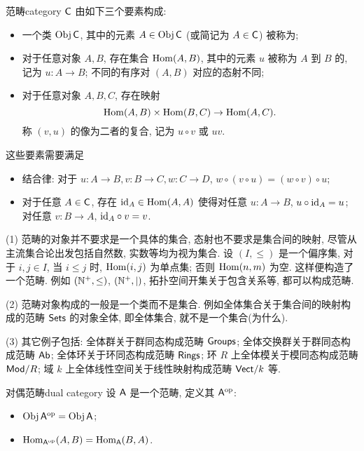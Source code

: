 \begin{definition}{范畴}{category}
 ${\mathsf{C}}$ 由如下三个要素构成:
\begin{itemize}
\item 一个类 ${\mathrm{Obj}\,}{\mathsf{C}}$, 其中的元素 $A\in{\mathrm{Obj}\,}{\mathsf{C}}$ (或简记为 $A\in{\mathsf{C}}$) 被称为;
\item 对于任意对象 $A,B$, 存在集合 ${\mathrm{Hom}}(A,B)$, 其中的元素 $u$ 被称为 $A$ 到 $B$ 的, 记为 $u:A\to B$; 不同的有序对 $(A,B)$ 对应的态射不同;
\item 对于任意对象 $A,B,C$, 存在映射
  \[{\mathrm{Hom}}(A,B)\times{\mathrm{Hom}}(B,C)\to {\mathrm{Hom}}(A,C).\]
称 $(v,u)$ 的像为二者的复合, 记为 $u\circ v$ 或 $uv$.
\end{itemize}
这些要素需要满足
\begin{itemize}
\item 结合律: 对于 $u:A\to B, v:B\to C, w:C\to D$, $w\circ(v\circ u)=(w\circ v)\circ u$;
\item 对于任意 $A\in{\mathsf{C}}$, 存在 ${\mathrm{id}}_A\in{\mathrm{Hom}}(A,A)$ 使得对任意 $u:A\to B$, $u\circ{\mathrm{id}}_A=u$; 对任意 $v:B\to A$, ${\mathrm{id}}_A\circ v=v$.
\end{itemize}
\end{definition}

\begin{example}
(1) 范畴的对象并不要求是一个具体的集合, 态射也不要求是集合间的映射, 尽管从主流集合论出发包括自然数, 实数等均为视为集合. 设 $(I,\le)$ 是一个偏序集, 对于 $i,j\in I$, 当 $i\le j$ 时, ${\mathrm{Hom}}(i,j)$ 为单点集; 否则 ${\mathrm{Hom}}(n,m)$ 为空. 这样便构造了一个范畴. 例如 $({\mathbb{N}}^+,\le)$, $({\mathbb{N}}^+,\mid)$, 拓扑空间开集关于包含关系等, 都可以构成范畴.

(2) 范畴对象构成的一般是一个类而不是集合. 例如全体集合关于集合间的映射构成的范畴 ${\mathsf{Sets}}$ 的对象全体, 即全体集合, 就不是一个集合(为什么).

(3) 其它例子包括: 全体群关于群同态构成范畴 ${\mathsf{Groups}}$; 全体交换群关于群同态构成范畴 ${\mathsf{Ab}}$; 全体环关于环同态构成范畴 ${\mathsf{Rings}}$; 环 $R$ 上全体模关于模同态构成范畴 ${\mathsf{Mod}}/R$; 域 $k$ 上全体线性空间关于线性映射构成范畴 ${\mathsf{Vect}}/k$ 等.
\end{example}

\begin{definition}{对偶范畴}{dual category}
设 ${\mathsf{A}}$ 是一个范畴, 定义其 ${\mathsf{A}}^{\mathrm{op}}$:
\begin{itemize}
\item ${\mathrm{Obj}\,} {\mathsf{A}}^{\mathrm{op}}={\mathrm{Obj}\,} {\mathsf{A}}$;
\item ${\mathrm{Hom}}_{{\mathsf{A}}^{\mathrm{op}}}(A,B)={\mathrm{Hom}}_{{\mathsf{A}}}(B,A)$.
\end{itemize}
\end{definition}

